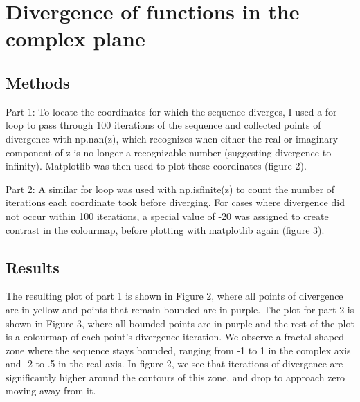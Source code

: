 \documentclass{article}
\begin{document}
\newpage
\section{Divergence of functions in the complex plane}
\subsection{Methods}

Part 1: To locate the coordinates for which the sequence diverges, I used a for loop to pass through 100 iterations of the sequence and collected points of divergence with np.nan(z), which recognizes when either the real or imaginary component of z is no longer a recognizable number (suggesting divergence to infinity). Matplotlib was then used to plot these coordinates (figure 2). 

Part 2: A similar for loop  was used with np.isfinite(z) to count the number of iterations each coordinate took before diverging. For cases where divergence did not occur within 100 iterations, a special value of -20 was assigned to create contrast in the colourmap, before plotting with matplotlib again (figure 3).

\subsection{Results}
The resulting plot of part 1 is shown in Figure 2, where all points of divergence are in yellow and points that remain bounded are in purple. The plot for part 2 is shown in Figure 3, where all bounded points are in purple and the rest of the plot is a colourmap of each point's divergence iteration. We observe a fractal shaped zone where the sequence stays bounded, ranging from -1 to 1 in the complex axis and -2 to .5 in the real axis. In figure 2, we see that iterations of divergence are significantly higher around the contours of this zone, and drop to approach zero moving away from it. 
\end{document}
